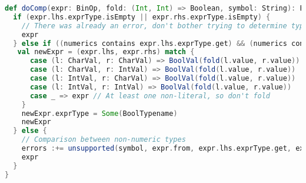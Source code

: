 \documentclass{article}
\begin{document}
\begin{lstlisting}[language=Scala]
 def doComp(expr: BinOp, fold: (Int, Int) => Boolean, symbol: String): Expression = {
  if (expr.lhs.exprType.isEmpty || expr.rhs.exprType.isEmpty) {
    // There was already an error, don't bother trying to determine types
    expr
  } else if ((numerics contains expr.lhs.exprType.get) && (numerics contains expr.rhs.exprType.get)) {
   val newExpr = (expr.lhs, expr.rhs) match {
      case (l: CharVal, r: CharVal) => BoolVal(fold(l.value, r.value))
      case (l: CharVal, r: IntVal) => BoolVal(fold(l.value, r.value))
      case (l: IntVal, r: CharVal) => BoolVal(fold(l.value, r.value))
      case (l: IntVal, r: IntVal) => BoolVal(fold(l.value, r.value))
      case _ => expr // At least one non-literal, so don't fold
    }
    newExpr.exprType = Some(BoolTypename)
    newExpr
  } else {
    // Comparison between non-numeric types
    errors :+= unsupported(symbol, expr.from, expr.lhs.exprType.get, expr.rhs.exprType.get)
    expr
  }
}
\end{lstlisting}

\end{document}

